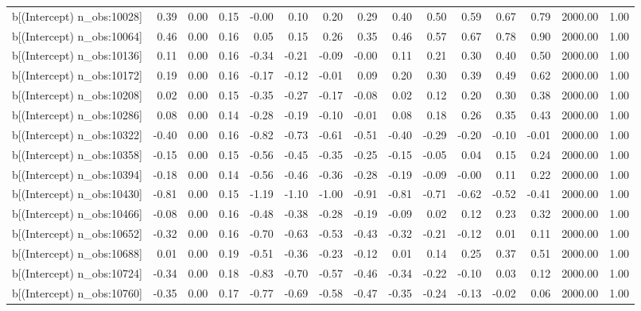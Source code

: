 \begin{table}[ht]
\begin{tabular}{rrrrrrrrrrrrrrr}
  b[(Intercept) n\_obs:10028] & 0.39 & 0.00 & 0.15 & -0.00 & 0.10 & 0.20 & 0.29 & 0.40 & 0.50 & 0.59 & 0.67 & 0.79 & 2000.00 & 1.00 \\ 
  b[(Intercept) n\_obs:10064] & 0.46 & 0.00 & 0.16 & 0.05 & 0.15 & 0.26 & 0.35 & 0.46 & 0.57 & 0.67 & 0.78 & 0.90 & 2000.00 & 1.00 \\ 
  b[(Intercept) n\_obs:10136] & 0.11 & 0.00 & 0.16 & -0.34 & -0.21 & -0.09 & -0.00 & 0.11 & 0.21 & 0.30 & 0.40 & 0.50 & 2000.00 & 1.00 \\ 
  b[(Intercept) n\_obs:10172] & 0.19 & 0.00 & 0.16 & -0.17 & -0.12 & -0.01 & 0.09 & 0.20 & 0.30 & 0.39 & 0.49 & 0.62 & 2000.00 & 1.00 \\ 
  b[(Intercept) n\_obs:10208] & 0.02 & 0.00 & 0.15 & -0.35 & -0.27 & -0.17 & -0.08 & 0.02 & 0.12 & 0.20 & 0.30 & 0.38 & 2000.00 & 1.00 \\ 
  b[(Intercept) n\_obs:10286] & 0.08 & 0.00 & 0.14 & -0.28 & -0.19 & -0.10 & -0.01 & 0.08 & 0.18 & 0.26 & 0.35 & 0.43 & 2000.00 & 1.00 \\ 
  b[(Intercept) n\_obs:10322] & -0.40 & 0.00 & 0.16 & -0.82 & -0.73 & -0.61 & -0.51 & -0.40 & -0.29 & -0.20 & -0.10 & -0.01 & 2000.00 & 1.00 \\ 
  b[(Intercept) n\_obs:10358] & -0.15 & 0.00 & 0.15 & -0.56 & -0.45 & -0.35 & -0.25 & -0.15 & -0.05 & 0.04 & 0.15 & 0.24 & 2000.00 & 1.00 \\ 
  b[(Intercept) n\_obs:10394] & -0.18 & 0.00 & 0.14 & -0.56 & -0.46 & -0.36 & -0.28 & -0.19 & -0.09 & -0.00 & 0.11 & 0.22 & 2000.00 & 1.00 \\ 
  b[(Intercept) n\_obs:10430] & -0.81 & 0.00 & 0.15 & -1.19 & -1.10 & -1.00 & -0.91 & -0.81 & -0.71 & -0.62 & -0.52 & -0.41 & 2000.00 & 1.00 \\ 
  b[(Intercept) n\_obs:10466] & -0.08 & 0.00 & 0.16 & -0.48 & -0.38 & -0.28 & -0.19 & -0.09 & 0.02 & 0.12 & 0.23 & 0.32 & 2000.00 & 1.00 \\ 
  b[(Intercept) n\_obs:10652] & -0.32 & 0.00 & 0.16 & -0.70 & -0.63 & -0.53 & -0.43 & -0.32 & -0.21 & -0.12 & 0.01 & 0.11 & 2000.00 & 1.00 \\ 
  b[(Intercept) n\_obs:10688] & 0.01 & 0.00 & 0.19 & -0.51 & -0.36 & -0.23 & -0.12 & 0.01 & 0.14 & 0.25 & 0.37 & 0.51 & 2000.00 & 1.00 \\ 
  b[(Intercept) n\_obs:10724] & -0.34 & 0.00 & 0.18 & -0.83 & -0.70 & -0.57 & -0.46 & -0.34 & -0.22 & -0.10 & 0.03 & 0.12 & 2000.00 & 1.00 \\ 
  b[(Intercept) n\_obs:10760] & -0.35 & 0.00 & 0.17 & -0.77 & -0.69 & -0.58 & -0.47 & -0.35 & -0.24 & -0.13 & -0.02 & 0.06 & 2000.00 & 1.00 \\ 

\end{tabular}
\end{table}
